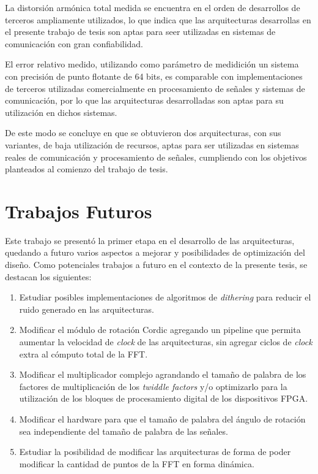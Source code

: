 La distorsión armónica total medida se encuentra en el orden de desarrollos de terceros ampliamente
utilizados, lo que indica que las arquitecturas desarrollas en el presente trabajo de tesis son
aptas para seer utilizadas en sistemas de comunicación con gran confiabilidad.

El error relativo medido, utilizando como parámetro de medidición un sistema con precisión de punto
flotante de 64 bits, es comparable con implementaciones de terceros utilizadas comercialmente en
procesamiento de señales y sistemas de comunicación, por lo que las arquitecturas desarrolladas son
aptas para su utilización en dichos sistemas.

De este modo se concluye en que se obtuvieron dos arquitecturas, con sus variantes, de baja
utilización de recursos, aptas para ser utilizadas en sistemas reales de comunicación y
procesamiento de señales, cumpliendo con los objetivos planteados al comienzo del trabajo de
tesis.

\section{Trabajos Futuros}

Este trabajo se presentó la primer etapa en el desarrollo de las arquitecturas, quedando
a futuro varios aspectos a mejorar y posibilidades de optimización del diseño.
Como potenciales trabajos a futuro en el contexto de la presente tesis, se destacan los siguientes:

\begin{enumerate}
	\item Estudiar posibles implementaciones de algoritmos de \textit{dithering} para reducir el ruido
	generado en las arquitecturas.
	\item Modificar el módulo de rotación Cordic agregando un pipeline que permita aumentar la
	velocidad de \textit{clock} de las arquitecturas, sin agregar ciclos de \textit{clock} extra al
	cómputo total de la FFT.
	\item Modificar el multiplicador complejo agrandando el tamaño de palabra de los factores de
	multiplicación de los \textit{twiddle factors} y/o optimizarlo para la utilización de los bloques
	de procesamiento digital de los dispositivos FPGA.
	\item Modificar el hardware para que el tamaño de palabra del ángulo de rotación sea independiente
	del tamaño de palabra de las señales.
	\item Estudiar la posibilidad de modificar las arquitecturas de forma de poder modificar la
	cantidad de puntos de la FFT en forma dinámica.
\end{enumerate}
